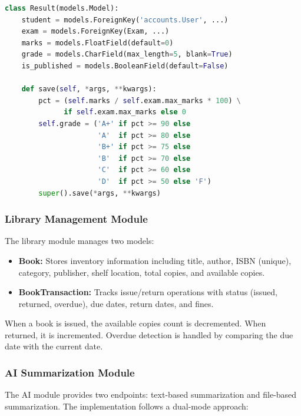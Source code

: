 \begin{lstlisting}[language=Python, caption={Auto-Grade Computation in Result Model}]
class Result(models.Model):
    student = models.ForeignKey('accounts.User', ...)
    exam = models.ForeignKey(Exam, ...)
    marks = models.FloatField(default=0)
    grade = models.CharField(max_length=5, blank=True)
    is_published = models.BooleanField(default=False)

    def save(self, *args, **kwargs):
        pct = (self.marks / self.exam.max_marks * 100) \
              if self.exam.max_marks else 0
        self.grade = ('A+' if pct >= 90 else 
                      'A'  if pct >= 80 else 
                      'B+' if pct >= 75 else 
                      'B'  if pct >= 70 else 
                      'C'  if pct >= 60 else 
                      'D'  if pct >= 50 else 'F')
        super().save(*args, **kwargs)
\end{lstlisting}

\subsubsection{Library Management Module}

The library module manages two models:

\begin{itemize}[leftmargin=2em]
    \item \textbf{Book:} Stores inventory information including title, author, ISBN (unique), category, publisher, shelf location, total copies, and available copies.
    \item \textbf{BookTransaction:} Tracks issue/return operations with status (issued, returned, overdue), due dates, return dates, and fines.
\end{itemize}

When a book is issued, the available copies count is decremented. When returned, it is incremented. Overdue detection is handled by comparing the due date with the current date.

\subsubsection{AI Summarization Module}

The AI module provides two endpoints: text-based summarization and file-based summarization. The implementation follows a dual-mode approach:

